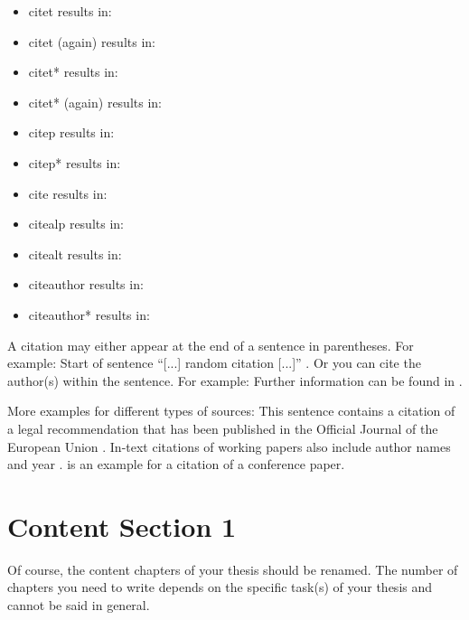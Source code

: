 \begin{itemize}
	\item citet results in: \citet{Becker2009} %
	\item citet (again) results in: \citet{Becker2009}
	\item citet* results in: \citet*{Becker2009}
	\item citet* (again) results in: \citet*{Becker2009}
	\item citep results in: \citep{Becker2009}
	\item citep* results in: \citep*{Becker2009}
	\item cite results in: \cite{Becker2009}
	\item citealp results in: \citealp{Becker2009}
	\item citealt results in: \citealt{Becker2009}
	\item citeauthor results in: \citeauthor{Becker2009}
	\item citeauthor* results in: \citeauthor*{Becker2009}
\end{itemize}


A citation may either appear at the end of a sentence in parentheses. For example: Start of sentence
``[...] random citation [...]'' \citep[][p.20]{bernheim1990}. Or you can cite the author(s) within the sentence. For example: Further information can be found in \cite{cassar2004}.

More examples for different types of sources: This sentence contains a citation of a legal recommendation that has been published in  the Official Journal of the European Union \citep{ec2013}. In-text citations of working papers also include author names and year \citep[see, for example,][]{kraemer2016}. \citet{breuer2015} is an example for a citation of a conference paper.


\chapter{Content Section 1} %
\label{ch:section1}



Of course, the content chapters of your thesis should be renamed. The number of chapters you need to write depends on the specific task(s) of your thesis and cannot be said in general.


